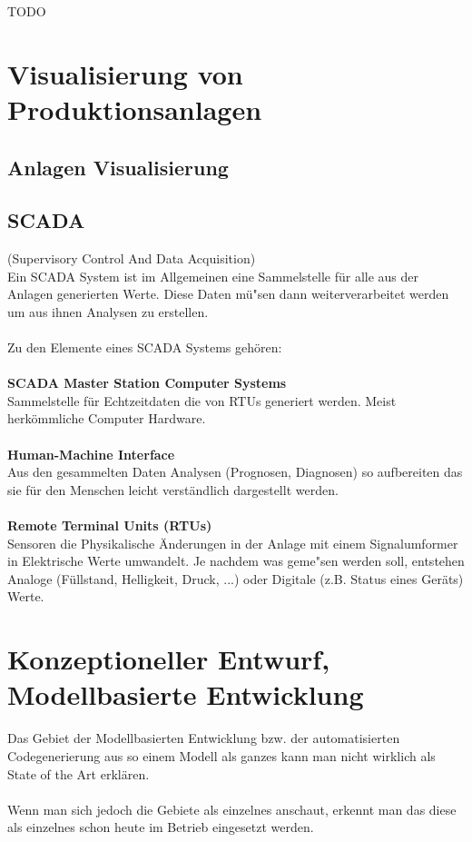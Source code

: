 TODO

\section{Visualisierung von Produktionsanlagen}
\subsection{Anlagen Visualisierung}
\subsection{SCADA}
(Supervisory Control And Data Acquisition)\\
Ein SCADA System ist im Allgemeinen eine Sammelstelle für alle aus der Anlagen generierten Werte. Diese Daten mü"sen dann weiterverarbeitet werden um aus ihnen Analysen zu erstellen.\\
\\
Zu den Elemente eines SCADA Systems gehören:\\
\\
\textbf{SCADA Master Station Computer Systems}\\
Sammelstelle für Echtzeitdaten die von RTUs generiert werden. Meist herkömmliche Computer Hardware.\\
\\
\textbf{Human-Machine Interface}\\
Aus den gesammelten Daten Analysen (Prognosen, Diagnosen) so aufbereiten das sie für den Menschen leicht verständlich dargestellt werden.\\
\\
\textbf{Remote Terminal Units (RTUs)}\\
Sensoren die Physikalische Änderungen in der Anlage mit einem Signalumformer in Elektrische Werte umwandelt. Je nachdem was geme"sen werden soll, entstehen Analoge (Füllstand, Helligkeit, Druck, ...) oder Digitale (z.B. Status eines Geräts) Werte.\\

\section{Konzeptioneller Entwurf, Modellbasierte Entwicklung}
Das Gebiet der Modellbasierten Entwicklung bzw. der automatisierten Codegenerierung aus so einem Modell als ganzes kann man nicht wirklich als State of the Art erklären.\\
\\
Wenn man sich jedoch die Gebiete als einzelnes anschaut, erkennt man das diese als einzelnes schon heute im Betrieb eingesetzt werden.
